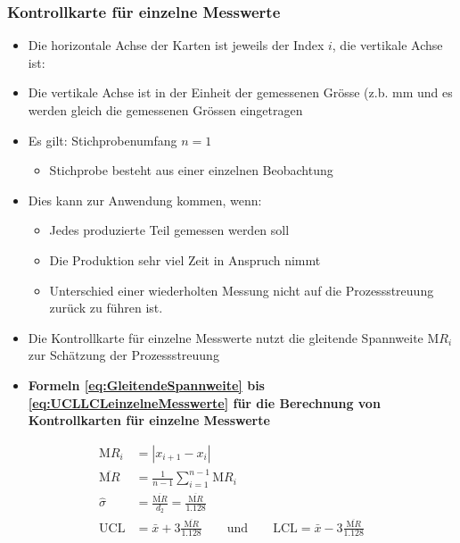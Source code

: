 \subsubsection{Kontrollkarte für einzelne Messwerte}
\begin{itemize}
	\item Die horizontale Achse der Karten ist jeweils der Index $i$, die vertikale Achse ist: 
	\item Die vertikale Achse ist in der Einheit der gemessenen Grösse (z.b. \si{\milli\meter} und es werden gleich die gemessenen Grössen eingetragen
	\item Es gilt: Stichprobenumfang $n=1$
	\begin{itemize}
		\item Stichprobe besteht aus einer einzelnen Beobachtung
	\end{itemize} 
	\item Dies kann zur Anwendung kommen, wenn:
	\begin{itemize}
		\item Jedes produzierte Teil gemessen werden soll
		\item Die Produktion sehr viel Zeit in Anspruch nimmt
		\item Unterschied einer wiederholten Messung nicht auf die Prozessstreuung zurück zu führen ist. 
	\end{itemize}
	\item Die Kontrollkarte für einzelne Messwerte nutzt die gleitende Spannweite $\text{M}R_i$ zur Schätzung der Prozessstreuung 
	\item \textbf{Formeln \ref{eq:GleitendeSpannweite} bis \ref{eq:UCLLCLeinzelneMesswerte} für die Berechnung von Kontrollkarten für einzelne Messwerte}
\end{itemize}
\begin{align}
	\label{eq:GleitendeSpannweite}
	\text{M}R_i &=\left\lvert x_{i+1}-x_i \right\rvert\\
	\label{eq:MittelwertGleitendeSpannweite}
	\overline{\text{M}R} &= \frac{1}{n-1}\sum_{i=1}^{n-1}\text{M}R_i\\
	\label{eq:SchaetzungStreuung}
	\hat{\sigma} &= \frac{\overline{\text{M}R}}{d_2} = \frac{\overline{\text{M}R}}{1.128}\\
	\label{eq:UCLLCLeinzelneMesswerte}
	\text{UCL} &= \bar{x} + 3\frac{\overline{\text{M}R}}{1.128} \qquad \text{und} \qquad \text{LCL} = \bar{x} - 3\frac{\overline{\text{M}R}}{1.128}
\end{align}

